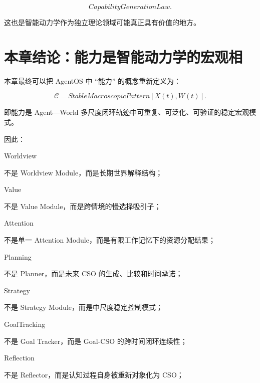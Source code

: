 \[
CapabilityGenerationLaw.
\]

这也是智能动力学作为独立理论领域可能真正具有价值的地方。

\section{本章结论：能力是智能动力学的宏观相}

本章最终可以把 AgentOS 中 ``能力'' 的概念重新定义为：

\[
\boxed{
\mathcal C
=
StableMacroscopicPattern
\left[
X(t),
W(t)
\right].
}
\]

即能力是 Agent---World 多尺度闭环轨迹中可重复、可泛化、可验证的稳定宏观模式。

因此：

\begin{statementbox}
Worldview
\end{statementbox}

不是 Worldview Module，而是长期世界解释结构；

\begin{statementbox}
Value
\end{statementbox}

不是 Value Module，而是跨情境的慢选择吸引子；

\begin{statementbox}
Attention
\end{statementbox}

不是单一 Attention Module，而是有限工作记忆下的资源分配结果；

\begin{statementbox}
Planning
\end{statementbox}

不是 Planner，而是未来 CSO 的生成、比较和时间承诺；

\begin{statementbox}
Strategy
\end{statementbox}

不是 Strategy Module，而是中尺度稳定控制模式；

\begin{statementbox}
GoalTracking
\end{statementbox}

不是 Goal Tracker，而是 Goal-CSO 的跨时间闭环连续性；

\begin{statementbox}
Reflection
\end{statementbox}

不是 Reflector，而是认知过程自身被重新对象化为 CSO；

